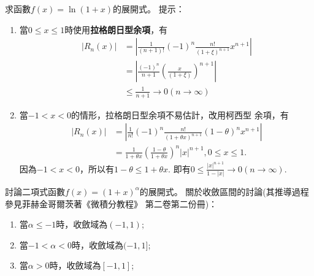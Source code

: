 \documentclass[a4paper,12pt]{article}
\theoremstyle{theorem}
\begin{document}
\begin{CJK*}{UTF8}{bsmi}
    \begin{example}
        求函數$\displaystyle f(x) = \ln (1+x)$的展開式。
        提示：
        \begin{enumerate}[label={\rm(\arabic*)}]
            \item 當$0 \le x \le 1$時使用\textbf{拉格朗日型余項}，有
                \[
                    \begin{split}
                        \left| R_n(x) \right| &  = 
                        \left| \frac{1}{(n+1)!}(-1)^n 
                        \frac{n!}{(1+\xi)^{n+1}}x^{n+1} \right| \\
                        & = \left|\frac{(-1)^n}{n+1}\left(\frac{x}
                        {(1+\xi)}\right)^{n+1}\right| \\
                        & \le \frac{1}{n+1} \to 0 (n \to \infty)
                    \end{split}
                \]
            \item 當$-1 < x < 0$的情形，拉格朗日型余項不易估計，改用柯西型
                余項，有
                \[
                    \begin{split}
                        \left| R_n(x) \right| & = \left| \frac{1}{n!}(-1)^n 
                        \frac{n!}{(1+\theta x)^{n+1}}(1-\theta)^n x^{n+1}
                        \right| \\
                        & = \frac{1}{1+\theta x}\left(\frac{1-\theta}
                        {1+\theta x}\right)^n\vert x \vert^{n+1}, 
                        0 \le x \le 1.
                    \end{split}
                \]
                因為$-1 < x < 0$，所以有$1 - \theta \le 1 + \theta x$.
                即有$\displaystyle 0 \le \frac{|x|^{n+1}}{1-|x|} \to 0 
                (n \to \infty)$.
        \end{enumerate}
    \end{example}
    \begin{example}
        討論二項式函數$f(x) = (1+x)^{\alpha}$的展開式。
        關於收斂區間的討論(其推導過程參見菲赫金哥爾茨著《微積分教程》
        第二卷第二份冊)：
        \begin{enumerate}[label={\rm(\arabic*)}]
            \item 當$\alpha \le -1$時，收斂域為$(-1,1)$;
            \item 當$-1 < \alpha < 0$時，收斂域為$(-1,1]$;
            \item 當$\alpha > 0$時，收斂域為$[-1, 1]$;
        \end{enumerate}
    \end{example}


\end{CJK*}
\end{document}
